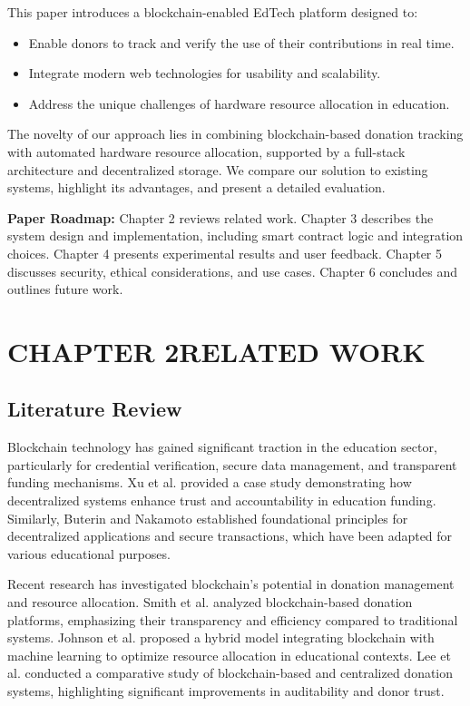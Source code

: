 \documentclass[a4paper,12pt]{report}
\newcommand{\mychapter}[2]{
    \setcounter{chapter}{#1}
    \setcounter{section}{0}
    \setcounter{table}{0}
    \setcounter{figure}{0}
    \chapter*{#2}
    \addcontentsline{toc}{chapter}{#2}
}
\begin{document}
This paper introduces a blockchain-enabled EdTech platform designed to:
\begin{itemize}
    \item Enable donors to track and verify the use of their contributions in real time.
    \item Integrate modern web technologies for usability and scalability.
    \item Address the unique challenges of hardware resource allocation in education.
\end{itemize}

The novelty of our approach lies in combining blockchain-based donation tracking with automated hardware resource allocation, supported by a full-stack architecture and decentralized storage. We compare our solution to existing systems, highlight its advantages, and present a detailed evaluation.

	\textbf{Paper Roadmap:} Chapter 2 reviews related work. Chapter 3 describes the system design and implementation, including smart contract logic and integration choices. Chapter 4 presents experimental results and user feedback. Chapter 5 discusses security, ethical considerations, and use cases. Chapter 6 concludes and outlines future work.

\mychapter{2}{CHAPTER 2\quad RELATED WORK}
\section{Literature Review}
Blockchain technology has gained significant traction in the education sector, particularly for credential verification, secure data management, and transparent funding mechanisms. Xu et al. \cite{b3} provided a case study demonstrating how decentralized systems enhance trust and accountability in education funding. Similarly, Buterin \cite{b2} and Nakamoto \cite{b1} established foundational principles for decentralized applications and secure transactions, which have been adapted for various educational purposes.

Recent research has investigated blockchain’s potential in donation management and resource allocation. Smith et al. \cite{b12} analyzed blockchain-based donation platforms, emphasizing their transparency and efficiency compared to traditional systems. Johnson et al. \cite{b13} proposed a hybrid model integrating blockchain with machine learning to optimize resource allocation in educational contexts. Lee et al. \cite{b14} conducted a comparative study of blockchain-based and centralized donation systems, highlighting significant improvements in auditability and donor trust.
\end{document}
